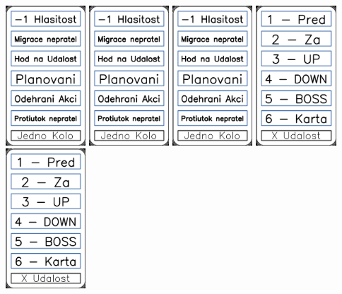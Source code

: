 \documentclass[a4paper]{article}
\begin{document}
	\includegraphics[width=3.0cm]{img-5_1}
	\includegraphics[width=3.0cm]{img-5_2}
	\includegraphics[width=3.0cm]{img-5_3}
	\includegraphics[width=3.0cm]{img-5_4}
	\includegraphics[width=3.0cm]{img-5_5}
\end{document}
